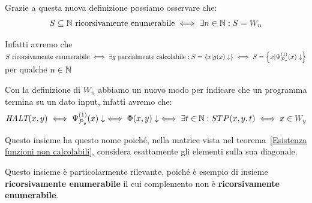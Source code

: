 
Grazie a questa nuova definizione possiamo osservare che:
\begin{equation}
    S \subseteq \mathbb{N} \text{ ricorsivamente enumerabile} \iff \exists n \in \mathbb{N} : S=W_n
\end{equation}

Infatti avremo che \(S \text{ ricorsivamente enumerabile} \iff \exists g \text{ parzialmente calcolabile}: S=\displaystyle{\left\{{x\vert g(x)\downarrow}\right\}} \iff S=\displaystyle{\left\{{x\vert \Psi_{\mathcal{P}_n}^{(1)}(x)\downarrow}\right\}}\) per qualche \(n \in \mathbb{N}\)

Con la definizione di \(W_n\) abbiamo un nuovo modo per indicare che un programma termina su un dato input, infatti avremo che:
\begin{equation}
  \textit{HALT}(x,y) \iff \Psi_{\mathcal{P}_y}^{(1)}(x)\downarrow \iff \Phi(x,y)\downarrow \iff \exists t \in \mathbb{N} : STP(x,y,t) \iff x \in W_y
\end{equation}


Questo insieme ha questo nome poiché, nella matrice vista nel teorema~\ref{Esistenza funzioni non calcolabili}, considera esattamente gli elementi sulla sua diagonale.

Questo insieme è particolarmente rilevante, poiché è esempio di insieme \textbf{ricorsivamente enumerabile} il cui complemento non è \textbf{ricorsivamente enumerabile}.

